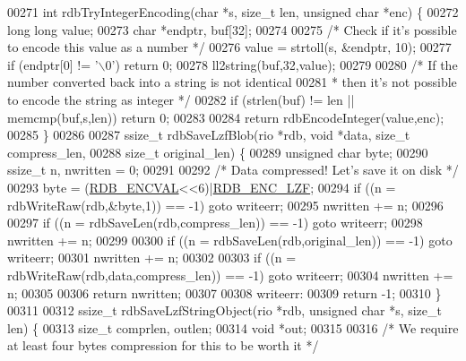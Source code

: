 \begin{DoxyCode}
{{{{{00271 \textcolor{keywordtype}{int} rdbTryIntegerEncoding(\textcolor{keywordtype}{char} *s, size\_t len, \textcolor{keywordtype}{unsigned} \textcolor{keywordtype}{char} *enc) \{
00272     \textcolor{keywordtype}{long} \textcolor{keywordtype}{long} value;
00273     \textcolor{keywordtype}{char} *endptr, buf[32];
00274 
00275     \textcolor{comment}{/* Check if it's possible to encode this value as a number */}
00276     value = strtoll(s, &endptr, 10);
00277     \textcolor{keywordflow}{if} (endptr[0] != \textcolor{stringliteral}{'\(\backslash\)0'}) \textcolor{keywordflow}{return} 0;
00278     ll2string(buf,32,value);
00279 
00280     \textcolor{comment}{/* If the number converted back into a string is not identical}
00281 \textcolor{comment}{     * then it's not possible to encode the string as integer */}
00282     \textcolor{keywordflow}{if} (strlen(buf) != len || memcmp(buf,s,len)) \textcolor{keywordflow}{return} 0;
00283 
00284     \textcolor{keywordflow}{return} rdbEncodeInteger(value,enc);
00285 \}
00286 
00287 ssize\_t rdbSaveLzfBlob(rio *rdb, \textcolor{keywordtype}{void} *data, size\_t compress\_len,
00288                        size\_t original\_len) \{
00289     \textcolor{keywordtype}{unsigned} \textcolor{keywordtype}{char} byte;
00290     ssize\_t n, nwritten = 0;
00291 
00292     \textcolor{comment}{/* Data compressed! Let's save it on disk */}
00293     byte = (\hyperlink{rdb_8h_a060ed4ae9ab0a1306508189d4c1b2e11}{RDB\_ENCVAL}<<6)|\hyperlink{rdb_8h_a9438d9c9147f6d8846e71c0722343a95}{RDB\_ENC\_LZF};
00294     \textcolor{keywordflow}{if} ((n = rdbWriteRaw(rdb,&byte,1)) == -1) \textcolor{keywordflow}{goto} writeerr;
00295     nwritten += n;
00296 
00297     \textcolor{keywordflow}{if} ((n = rdbSaveLen(rdb,compress\_len)) == -1) \textcolor{keywordflow}{goto} writeerr;
00298     nwritten += n;
00299 
00300     \textcolor{keywordflow}{if} ((n = rdbSaveLen(rdb,original\_len)) == -1) \textcolor{keywordflow}{goto} writeerr;
00301     nwritten += n;
00302 
00303     \textcolor{keywordflow}{if} ((n = rdbWriteRaw(rdb,data,compress\_len)) == -1) \textcolor{keywordflow}{goto} writeerr;
00304     nwritten += n;
00305 
00306     \textcolor{keywordflow}{return} nwritten;
00307 
00308 writeerr:
00309     \textcolor{keywordflow}{return} -1;
00310 \}
00311 
00312 ssize\_t rdbSaveLzfStringObject(rio *rdb, \textcolor{keywordtype}{unsigned} \textcolor{keywordtype}{char} *s, size\_t len) \{
00313     size\_t comprlen, outlen;
00314     \textcolor{keywordtype}{void} *out;
00315 
00316     \textcolor{comment}{/* We require at least four bytes compression for this to be worth it */}
}}}}}
\end{DoxyCode}
